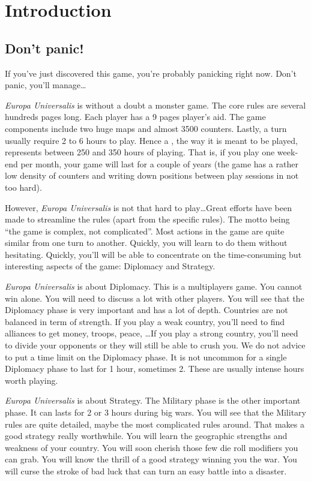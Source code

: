 
\chapter*{Introduction}

\section*{Don't panic!}
If you've just discovered this game, you're probably panicking right
now. Don't panic, you'll manage\ldots

\emph{Europa Universalis} is without a doubt a monster game. The core rules
are several hundreds pages long. Each player has a 9 pages player's aid. The
game components include two huge maps and almost 3500 counters. Lastly, a turn
usually require 2 to 6 hours to play. Hence a , the way
it is meant to be played, represents between 250 and 350 hours of
playing. That is, if you play one week-end per month, your game will last for
a couple of years (the game has a rather low density of counters and writing
down positions between play sessions in not too hard).

However, \emph{Europa Universalis} is not that hard to play\ldots Great
efforts have been made to streamline the rules (apart from the specific
rules). The motto being ``the game is complex, not complicated''. Most actions
in the game are quite similar from one turn to another. Quickly, you will learn
to do them without hesitating. Quickly, you'll will be able to concentrate on
the time-consuming but interesting aspects of the game: Diplomacy and
Strategy.

\emph{Europa Universalis} is about Diplomacy. This is a multiplayers game. You
cannot win alone. You will need to discuss a lot with other players. You will
see that the Diplomacy phase is very important and has a lot of
depth. Countries are not balanced in term of strength. If you play a weak
country, you'll need to find alliances to get money, troops, peace, \ldots If
you play a strong country, you'll need to divide your opponents or they will
still be able to crush you. We do not advice to put a time limit on the
Diplomacy phase. It is not uncommon for a single Diplomacy phase to last for 1
hour, sometimes 2. These are usually intense hours worth playing.

\emph{Europa Universalis} is about Strategy. The Military phase is the other
important phase. It can lasts for 2 or 3 hours during big wars. You will see
that the Military rules are quite detailed, maybe the most complicated rules
around. That makes a good strategy really worthwhile. You will learn the
geographic strengths and weakness of your country. You will soon cherish those
few  die roll modifiers you can grab. You will know the thrill of a
good strategy winning you the war. You will curse the stroke of bad luck that
can turn an easy battle into a disaster.

